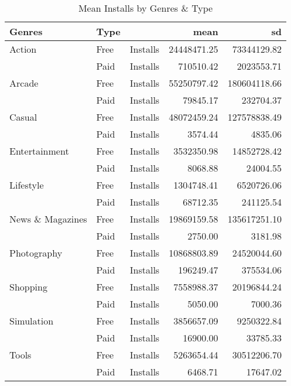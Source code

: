 \documentclass[
]{article}
\begin{document}
\begin{table}

\caption{\label{tab:unnamed-chunk-6}Mean Installs by Genres & Type}
\centering
\begin{tabular}[t]{lllrr}
\toprule
Genres & Type &   & mean & sd\\
\midrule
Action & Free & Installs & \num{24448471.25} & \num{73344129.82}\\
 & Paid & Installs & \num{710510.42} & \num{2023553.71}\\
Arcade & Free & Installs & \num{55250797.42} & \num{180604118.66}\\
 & Paid & Installs & \num{79845.17} & \num{232704.37}\\
Casual & Free & Installs & \num{48072459.24} & \num{127578838.49}\\
 & Paid & Installs & \num{3574.44} & \num{4835.06}\\
Entertainment & Free & Installs & \num{3532350.98} & \num{14852728.42}\\
 & Paid & Installs & \num{8068.88} & \num{24004.55}\\
Lifestyle & Free & Installs & \num{1304748.41} & \num{6520726.06}\\
 & Paid & Installs & \num{68712.35} & \num{241125.54}\\
News \& Magazines & Free & Installs & \num{19869159.58} & \num{135617251.10}\\
 & Paid & Installs & \num{2750.00} & \num{3181.98}\\
Photography & Free & Installs & \num{10868803.89} & \num{24520044.60}\\
 & Paid & Installs & \num{196249.47} & \num{375534.06}\\
Shopping & Free & Installs & \num{7558988.37} & \num{20196844.24}\\
 & Paid & Installs & \num{5050.00} & \num{7000.36}\\
Simulation & Free & Installs & \num{3856657.09} & \num{9250322.84}\\
 & Paid & Installs & \num{16900.00} & \num{33785.33}\\
Tools & Free & Installs & \num{5263654.44} & \num{30512206.70}\\
 & Paid & Installs & \num{6468.71} & \num{17647.02}\\
\bottomrule
\end{tabular}
\end{table}
\end{document}
